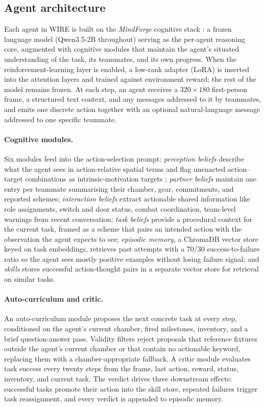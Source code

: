 \documentclass{article}
\theoremstyle{plain}
\theoremstyle{definition}
\theoremstyle{remark}
\begin{document}
\subsection{Agent architecture}
\label{sec:agent_architecture}

Each agent in WIRE is built on the \emph{MindForge} cognitive stack \cite{licua2025mindforge}: a frozen language model (Qwen3.5-2B throughout) serving as the per-agent reasoning core, augmented with cognitive modules that maintain the agent's situated understanding of the task, its teammates, and its own progress. When the reinforcement-learning layer is enabled, a low-rank adapter (LoRA) \cite{hu2022lora} is inserted into the attention layers and trained against environment reward; the rest of the model remains frozen. At each step, an agent receives a $320 \times 180$ first-person frame, a structured text context, and any messages addressed to it by teammates, and emits one discrete action together with an optional natural-language message addressed to one specific teammate.

\paragraph{Cognitive modules.}
Six modules feed into the action-selection prompt: \emph{perception beliefs} describe what the agent sees in action-relative spatial terms and flag unenacted action--target combinations as intrinsic-motivation targets \cite{georgeon2012interactional}; \emph{partner beliefs} maintain one entry per teammate summarising their chamber, gear, commitments, and reported schemes; \emph{interaction beliefs} extract actionable shared information like role assignments, switch and door status, combat coordination, team-level warnings from recent conversation; \emph{task beliefs} provide a procedural context for the current task, framed as a scheme that pairs an intended action with the observation the agent expects to see; \emph{episodic memory}, a ChromaDB vector store keyed on task embeddings, retrieves past attempts with a 70/30 success-to-failure ratio so the agent sees mostly positive examples without losing failure signal; and \emph{skills} stores successful action-thought pairs in a separate vector store for retrieval on similar tasks.

\paragraph{Auto-curriculum and critic.}
An auto-curriculum module proposes the next concrete task at every step, conditioned on the agent's current chamber, fired milestones, inventory, and a brief question-answer pass. Validity filters reject proposals that reference fixtures outside the agent's current chamber or that contain no actionable keyword, replacing them with a chamber-appropriate fallback. A critic module evaluates task success every twenty steps from the frame, last action, reward, status, inventory, and current task. The verdict drives three downstream effects: successful tasks promote their action into the skill store, repeated failures trigger task reassignment, and every verdict is appended to episodic memory.
\end{document}
